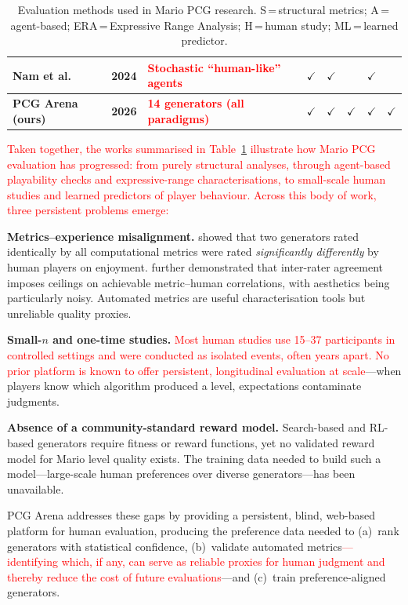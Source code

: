 \documentclass[shortabstract, mgr, english]{iithesis}
\newcommand{\changed}[1]{\textcolor{red}{#1}}
\begin{document}
\begin{table}[H]
\begin{tabular}{lllccccc}
Nam et al.                  & 2024 & \changed{Stochastic ``human-like'' agents} & $\checkmark$ & $\checkmark$ &              & $\checkmark$ &              \\
\midrule
\textbf{PCG Arena (ours)}   & \textbf{2026} & \changed{\textbf{14 generators (all paradigms)}} & $\checkmark$ & $\checkmark$ & $\checkmark$ & $\checkmark$ & $\checkmark$ \\
\bottomrule
\end{tabular}
\caption{Evaluation methods used in Mario PCG research.
  S\,=\,structural metrics;
  A\,=\,agent-based;
  ERA\,=\,Expressive Range Analysis;
  H\,=\,human study;
  ML\,=\,learned predictor.}
\label{tab:eval-comparison}
\end{table}

\changed{Taken together, the works summarised in Table~\ref{tab:eval-comparison}
illustrate how Mario PCG evaluation has progressed: from purely structural
analyses, through agent-based playability checks and expressive-range
characterisations, to small-scale human studies and learned predictors of
player behaviour. Across this body of work, three persistent problems emerge:}

\textbf{Metrics--experience misalignment.} \citet{marino2015empirical} showed
that two generators rated identically by all computational metrics were rated
\emph{significantly differently} by human players on enjoyment.
\citet{summerville2017understanding} further demonstrated that inter-rater
agreement imposes ceilings on achievable metric--human correlations, with
aesthetics being particularly noisy. Automated metrics are useful
characterisation tools but unreliable quality proxies.

\textbf{Small-$n$ and one-time studies.} \changed{Most human studies use 15--37
participants in controlled settings and were conducted as isolated events, often
years apart. No prior platform is known to offer persistent, longitudinal
evaluation at scale}---when players know which algorithm produced a level,
expectations contaminate judgments.

\textbf{Absence of a community-standard reward model.} Search-based and
RL-based generators require fitness or reward functions, yet no validated reward
model for Mario level quality exists. The training data needed to build such a
model---large-scale human preferences over diverse generators---has been
unavailable.

PCG Arena addresses these gaps by providing a persistent, blind, web-based
platform for human evaluation, producing the preference data needed to
(a)~rank generators with statistical confidence, (b)~validate automated
metrics\changed{---identifying which, if any, can serve as reliable proxies for
human judgment and thereby reduce the cost of future evaluations}---and
(c)~train preference-aligned generators.
\end{document}
